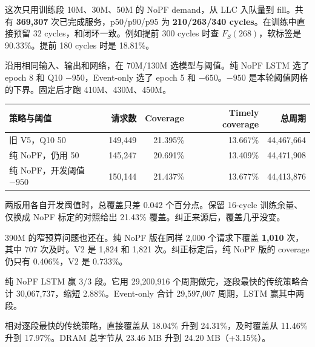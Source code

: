 这次只用训练段 10M、30M、50M 的 NoPF demand，从 LLC 入队量到 fill。共有 \textbf{369,307} 次已完成服务，p50/p90/p95 为 \textbf{210/263/340 cycles}。在训练中直接预留 32 cycles，和闭环一致。例如提前 300 cycles 时查 $F_S(268)$，软标签是 90.33\%。提前 180 cycles 时是 18.81\%。

沿用相同输入、输出和网络，在 70M/130M 选模型与阈值。纯 NoPF LSTM 选了 epoch 8 和 Q10 $-950$，Event-only 选了 epoch 5 和 $-650$。$-950$ 是本轮阈值网格的下界。固定后才跑 410M、430M、450M。

{\small
\begin{tabular}{@{}lrrrr@{}}
\toprule
策略与阈值 & 请求数 & Coverage & Timely coverage & 总周期\\
\midrule
旧 V5，Q10 50 & 149,449 & 21.395\% & 13.667\% & 44,467,664\\
纯 NoPF，仍用 50 & 145,247 & 20.691\% & 13.409\% & 44,471,908\\
纯 NoPF，开发阈值 $-950$ & 150,144 & 21.437\% & 13.677\% & 44,413,876\\
\bottomrule
\end{tabular}\par}
两版用各自开发阈值时，总覆盖只差 0.042 个百分点。保留 16-cycle 训练余量、仅换成 NoPF 标定的对照给出 21.43\% 覆盖。纠正来源后，覆盖几乎没变。

390M 的窄预算问题也还在。纯 NoPF 版在同样 2,000 个请求下覆盖 \textbf{1,010} 次，其中 707 次及时。V2 是 1,824 和 1,821 次。纠正标定后，纯 NoPF 版的 coverage 仍只有 0.406\%，V2 是 0.733\%。

\heatmap{3.24cm}{\FreshRegions}{\FreshIpcCells}
纯 NoPF LSTM 赢 3/3 段。它用 29,200,916 个周期做完，逐段最快的传统策略合计 30,067,737，缩短 2.88\%。Event-only 合计 29,597,007 周期，LSTM 赢其中两段。

相对逐段最快的传统策略，直接覆盖从 18.04\% 升到 24.31\%，及时覆盖从 11.46\% 升到 17.97\%。DRAM 总字节从 23.46 MB 升到 24.20 MB（+3.15\%）。

\newpage
{}
\heatmap{2.33cm}{\QualityNames}{\FreshQualityCells}
\heatmap{2.48cm}{\CostNames}{\FreshCostCells}
